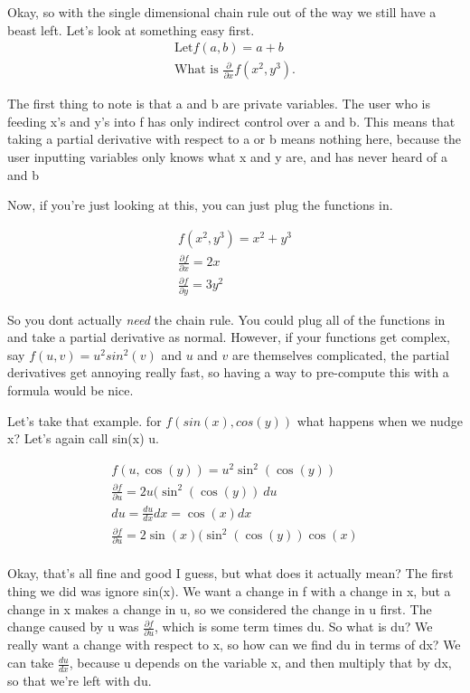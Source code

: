\documentclass[12pt, letterpaper]{article}
\begin{document}
Okay, so with the single dimensional chain rule out of the way we still have a beast left. Let's look at something easy first.
\begin{gather*}
    \text{Let} f(a, b) = a + b\\
    \text{What is } \frac{\partial}{\partial x}f(x^2, y^3).
\end{gather*}

The first thing to note is that a and b are private variables. The user who is feeding x's and y's into f has only indirect control over a and b. This means that taking a partial derivative with respect to a or b means nothing here, because the user inputting variables only knows what x and y are, and has never heard of a and b

Now, if you're just looking at this, you can just plug the functions in.

\begin{gather*}
    f(x^2, y^3) = x^2 + y^3\\
    \frac{\partial f}{\partial x} = 2x \\
    \frac{\partial f}{\partial y} = 3y^2
\end{gather*}

So you dont actually \emph{need} the chain rule. You could plug all of the functions in and take a partial derivative as normal.
However, if your functions get complex, say $f(u, v) = u^2sin^2(v)$ and $u$ and $v$ are themselves complicated, the partial derivatives get annoying really fast, so having a way to pre-compute this with a formula would be nice.

Let's take that example. for $f(sin(x), cos(y))$ what happens when we nudge x? Let's again call sin(x) u.

\begin{gather*}
    f(u, \cos(y)) = u^2\sin^2(\cos(y))\\
    \frac{\partial f}{\partial u} = 2u(\sin^2(\cos(y))\ du\\
    du = \frac{du}{dx}dx = \cos(x) dx\\
    \frac{\partial f}{\partial u} = 2\sin(x)(\sin^2(\cos(y))\cos(x)\\
\end{gather*}

Okay, that's all fine and good I guess, but what does it actually mean? The first thing we did was ignore sin(x). We want a change in f with a change in x, but a change in x makes a change in u, so we considered the change in u first.
The change caused by u was $\frac{\partial f}{\partial u}$, which is some term times du. So what is du? We really want a change with respect to x, so how can we find du in terms of dx?
We can take $\frac{du}{dx}$, because u depends on the variable x, and then multiply that by dx, so that we're left with du.
\end{document}
